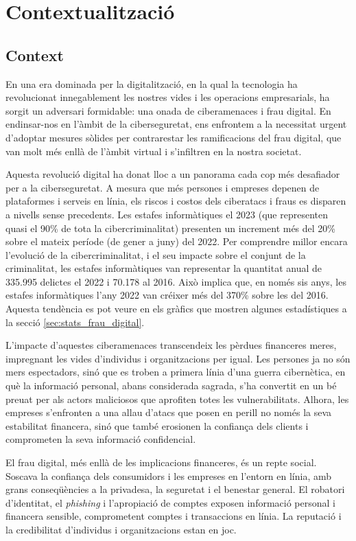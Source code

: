 \section{Contextualització} \label{sec:context}


\subsection{Context}
En una era dominada per la digitalització, en la qual la tecnologia ha revolucionat innegablement les nostres vides i les operacions empresarials, ha sorgit un adversari formidable: una onada de ciberamenaces i frau digital. En endinsar-nos en l'àmbit de la ciberseguretat, ens enfrontem a la necessitat urgent d'adoptar mesures sòlides per contrarestar les ramificacions del frau digital, que van molt més enllà de l'àmbit virtual i s'infiltren en la nostra societat.

Aquesta revolució digital ha donat lloc a un panorama cada cop més desafiador per a la ciberseguretat. A mesura que més persones i empreses depenen de plataformes i serveis en línia, els riscos i costos dels ciberatacs i fraus es disparen a nivells sense precedents. Les estafes informàtiques el 2023 (que representen quasi el 90\% de tota la cibercriminalitat) presenten un increment més del 20\% sobre el mateix període (de gener a juny) del 2022. Per comprendre millor encara l'evolució de la cibercriminalitat, i el seu impacte sobre el conjunt de la criminalitat, les estafes informàtiques van representar la quantitat anual de 335.995 delictes el 2022 i 70.178 al 2016. Això implica que, en només sis anys, les estafes informàtiques l'any 2022 van créixer més del 370\% sobre les del 2016. \cite{criminalitat} Aquesta tendència es pot veure en els gràfics que mostren algunes estadístiques a la secció \ref{sec:stats_frau_digital}.

L'impacte d'aquestes ciberamenaces transcendeix les pèrdues financeres meres, impregnant les vides d'individus i organitzacions per igual. Les persones ja no són mers espectadors, sinó que es troben a primera línia d'una guerra cibernètica, en què la informació personal, abans considerada sagrada, s'ha convertit en un bé preuat per als actors maliciosos que aprofiten totes les vulnerabilitats. Alhora, les empreses s'enfronten a una allau d'atacs que posen en perill no només la seva estabilitat financera, sinó que també erosionen la confiança dels clients i comprometen la seva informació confidencial.

El frau digital, més enllà de les implicacions financeres, és un repte social. Soscava la confiança dels consumidors i les empreses en l'entorn en línia, amb grans conseqüències a la privadesa, la seguretat i el benestar general. El robatori d'identitat, el \textit{phishing} i l'apropiació de comptes exposen informació personal i financera sensible, comprometent comptes i transaccions en línia. La reputació i la credibilitat d'individus i organitzacions estan en joc.

